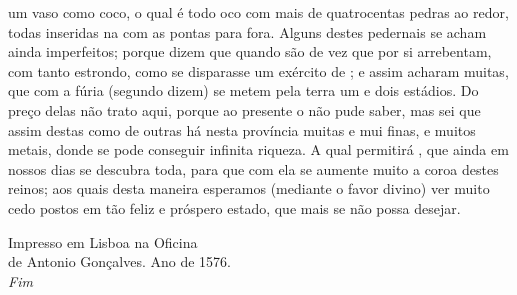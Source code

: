 um vaso como coco, o qual é todo oco com mais de quatrocentas pedras			%
ao redor, todas inseridas na  com as pontas para fora. Alguns
destes pedernais se acham ainda imperfeitos; porque dizem que quando			%
são de vez que por si arrebentam, com tanto estrondo, como se
disparasse um exército de ; e assim acharam muitas, que com a
fúria (segundo dizem) se metem pela terra um e dois estádios. Do preço
delas não trato aqui, porque ao presente o não pude saber, mas sei que
assim destas como de outras há nesta província muitas e mui finas, e
muitos metais, donde se pode conseguir infinita riqueza. A qual			%
permitirá , que ainda em nossos dias se descubra toda, para que com
ela se aumente muito a coroa destes reinos; aos quais desta maneira
esperamos (mediante o favor divino) ver muito cedo postos em tão feliz
e próspero estado, que mais se não possa desejar.



\vspace*{\fill}

\begin{center}
Impresso em Lisboa na Oficina\\
de Antonio Gonçalves.
Ano de 1576.\\
\textit{Fim}
\end{center}
\vspace*{\fill}


%
%
%
